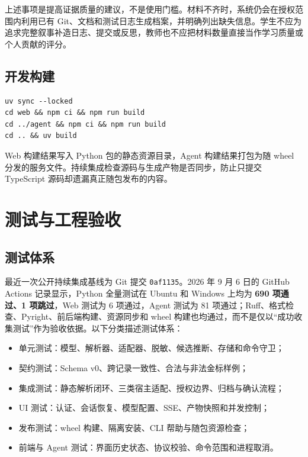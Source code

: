 \documentclass[UTF8,a4paper,12pt]{ctexart}
\begin{document}
上述事项是提高证据质量的建议，不是使用门槛。材料不齐时，系统仍会在授权范围内利用已有 Git、文档和测试日志生成档案，并明确列出缺失信息。学生不应为追求完整叙事补造日志、提交或反思，教师也不应把材料数量直接当作学习质量或个人贡献的评分。

\subsection{开发构建}

\begin{lstlisting}
uv sync --locked
cd web && npm ci && npm run build
cd ../agent && npm ci && npm run build
cd .. && uv build
\end{lstlisting}

Web 构建结果写入 Python 包的静态资源目录，Agent 构建结果打包为随 wheel 分发的服务文件。持续集成检查源码与生成产物是否同步，防止只提交 TypeScript 源码却遗漏真正随包发布的内容。

\section{测试与工程验收}

\subsection{测试体系}

最近一次公开持续集成基线为 Git 提交 \texttt{0af1135}。2026 年 9 月 6 日的 GitHub Actions 记录显示，Python 全量测试在 Ubuntu 和 Windows 上均为 \textbf{690 项通过、1 项跳过}，Web 测试为 6 项通过，Agent 测试为 81 项通过；Ruff、格式检查、Pyright、前后端构建、资源同步和 wheel 构建也均通过，而不是仅以“成功收集测试”作为验收依据。以下分类描述测试体系：

\begin{itemize}
  \item 单元测试：模型、解析器、适配器、脱敏、候选推断、存储和命令守卫；
  \item 契约测试：Schema v0、跨记录一致性、合法与非法金标样例；
  \item 集成测试：静态解析闭环、三类宿主适配、授权边界、归档与确认流程；
  \item UI 测试：认证、会话恢复、模型配置、SSE、产物快照和并发控制；
  \item 发布测试：wheel 构建、隔离安装、CLI 帮助与随包资源检查；
  \item 前端与 Agent 测试：界面历史状态、协议校验、命令范围和进程取消。
\end{itemize}
\end{document}
